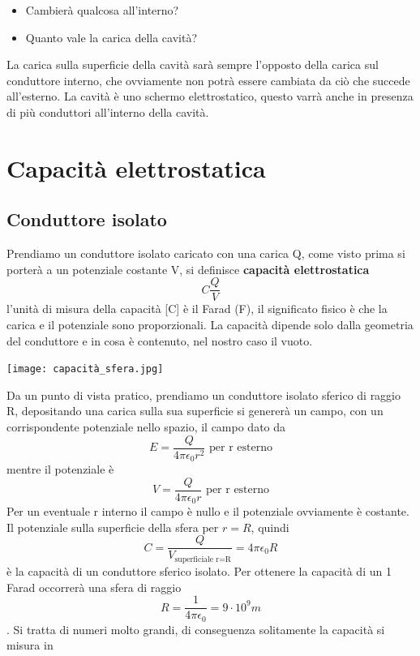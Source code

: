 \documentclass[a4paper, 12pt]{book}
\theoremstyle{plain}
\begin{document}
\begin{itemize}
    \item Cambierà qualcosa all'interno?
    \item Quanto vale la carica della cavità? 
\end{itemize}

La carica sulla superficie della cavità sarà sempre l'opposto
della carica sul conduttore interno, che ovviamente non 
potrà essere cambiata da ciò che succede all'esterno. La
cavità è uno schermo elettrostatico, questo varrà 
anche in presenza di più conduttori all'interno della 
cavità.

\section{Capacità elettrostatica}
\subsection{Conduttore isolato}

Prendiamo un conduttore isolato caricato con una carica Q,
come visto prima si porterà a un potenziale costante 
V, si definisce \textbf{capacità elettrostatica} \[ C
\frac{Q}{V} \] l'unità di misura della capacità [C] è il 
Farad (F), il significato fisico è che la carica e il 
potenziale sono proporzionali. La capacità dipende solo dalla
geometria del conduttore e in cosa è contenuto, nel nostro caso 
il vuoto.

\begin{center}
    \texttt{[image: capacità\_sfera.jpg]}
\end{center}

Da un punto di vista pratico, prendiamo un conduttore isolato 
sferico di raggio R, depositando una carica sulla sua
superficie si genererà un campo, con un corrispondente potenziale 
nello spazio, il campo dato da \[ E = \frac{Q}{4\pi \epsilon_0 r^2} \textrm{ per r esterno} \] 
mentre il potenziale è \[ V = \frac{Q}{4\pi \epsilon_0 r} \textrm{ per r esterno} \]
Per un eventuale r interno il campo è nullo e il potenziale ovviamente 
è costante. Il potenziale sulla superficie della sfera 
per $r = R$, quindi  \[ C = \frac{Q}{V_{\textrm{superficiale r=R}}} = 4\pi \epsilon_0 R \]
è la capacità di un conduttore sferico isolato. Per ottenere
la capacità di un 1 Farad occorrerà una sfera di raggio
 \[ R = \frac{1}{4\pi \epsilon_0 } = 9\cdot 10^9m \] . Si tratta 
di numeri molto grandi, di conseguenza solitamente la capacità si misura in 
\end{document}
